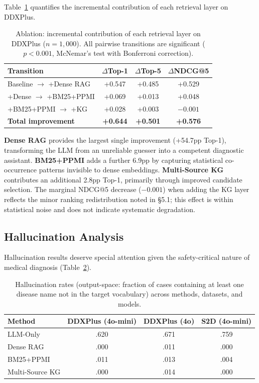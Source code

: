\documentclass[runningheads]{llncs}
\begin{document}
Table~\ref{tab:ablation} quantifies the incremental contribution of each retrieval layer on DDXPlus.

\begin{table}[t]
\centering
\caption{Ablation: incremental contribution of each retrieval layer on DDXPlus ($n{=}1{,}000$). All pairwise transitions are significant ($p < 0.001$, McNemar's test with Bonferroni correction).}
\label{tab:ablation}
\begin{tabular}{lccc}
\toprule
\textbf{Transition} & \textbf{$\Delta$Top-1} & \textbf{$\Delta$Top-5} & \textbf{$\Delta$NDCG@5} \\
\midrule
Baseline $\to$ +Dense RAG    & +0.547 & +0.485 & +0.529 \\
+Dense $\to$ +BM25+PPMI      & +0.069 & +0.013 & +0.048 \\
+BM25+PPMI $\to$ +KG         & +0.028 & +0.003 & $-0.001$ \\
\midrule
\textbf{Total improvement}   & \textbf{+0.644} & \textbf{+0.501} & \textbf{+0.576} \\
\bottomrule
\end{tabular}
\end{table}

\textbf{Dense RAG} provides the largest single improvement (+54.7pp Top-1), transforming the LLM from an unreliable guesser into a competent diagnostic assistant. \textbf{BM25+PPMI} adds a further 6.9pp by capturing statistical co-occurrence patterns invisible to dense embeddings. \textbf{Multi-Source KG} contributes an additional 2.8pp Top-1, primarily through improved candidate selection. The marginal NDCG@5 decrease ($-0.001$) when adding the KG layer reflects the minor ranking redistribution noted in \S5.1; this effect is within statistical noise and does not indicate systematic degradation.

\subsection{Hallucination Analysis}
\label{sec:hallucination}

Hallucination results deserve special attention given the safety-critical nature of medical diagnosis (Table~\ref{tab:halluc}).

\begin{table}[t]
\centering
\caption{Hallucination rates (output-space: fraction of cases containing at least one disease name not in the target vocabulary) across methods, datasets, and models.}
\label{tab:halluc}
\begin{tabular}{lccc}
\toprule
\textbf{Method} & \textbf{DDXPlus (4o-mini)} & \textbf{DDXPlus (4o)} & \textbf{S2D (4o-mini)} \\
\midrule
LLM-Only        & .620 & .671 & .759 \\
Dense RAG        & .000 & .011 & .000 \\
BM25+PPMI        & .011 & .013 & .004 \\
Multi-Source KG  & .000 & .014 & .000 \\
\bottomrule
\end{tabular}
\end{table}
\end{document}
